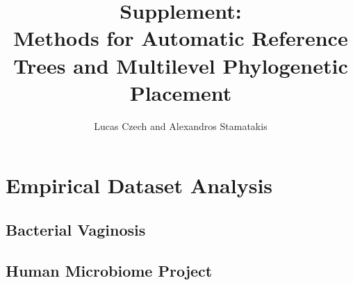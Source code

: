 \documentclass[a4paper,10pt,DIV=14]{scrartcl}
\title{Supplement:\\Methods for Automatic Reference Trees and Multilevel Phylogenetic Placement}
\author{Lucas Czech and Alexandros Stamatakis}
\date{}
\newcommand{\beginsupplement}{%
    \setcounter{table}{0}
    \renewcommand{\thetable}{S\arabic{table}}%
    \setcounter{figure}{0}
    \renewcommand{\thefigure}{S\arabic{figure}}%
}
\begin{document}

\begin{acronym}

\end{acronym}

\beginsupplement


\begingroup
\let\center\flushleft
\let\endcenter\endflushleft
\maketitle
\endgroup




\section{Empirical Dataset Analysis}
\label{sec:DetailsBioDatasets}

\subsection{Bacterial Vaginosis}
\label{sec:DetailsBioDatasets:sub:BV}

\subsection{Human Microbiome Project}
\label{sec:DetailsBioDatasets:sub:HMP}

\end{document}
